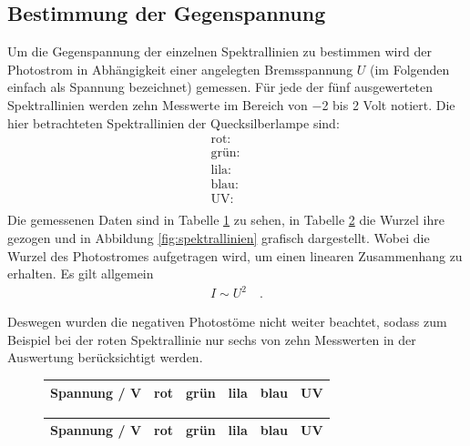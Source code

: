 \subsection{Bestimmung der Gegenspannung}
\label{sec:gegenspannung}
Um die Gegenspannung der einzelnen Spektrallinien zu bestimmen wird der Photostrom in Abhängigkeit einer angelegten Bremsspannung $U$ (im Folgenden einfach als Spannung bezeichnet) gemessen. Für jede der fünf ausgewerteten Spektrallinien werden zehn Messwerte im Bereich von  \num{-2} bis \num{2} Volt notiert.
Die hier betrachteten Spektrallinien der Quecksilberlampe sind:
\begin{align*}
	\text{rot:} \quad &  \\
	\text{grün:} \quad &  \\
	\text{lila:} \quad &  \\
	\text{blau:} \quad &  \\
	\text{UV:} \quad &  \\
\end{align*}
Die gemessenen Daten sind in Tabelle \ref{tab:messdaten1}  zu sehen, in Tabelle \ref{tab:messdaten2} die Wurzel ihre gezogen und in Abbildung \ref{fig:spektrallinien} grafisch dargestellt. Wobei die Wurzel des Photostromes aufgetragen wird, um einen linearen Zusammenhang zu erhalten. Es gilt allgemein
\begin{align}
	I \sim U^2 \quad .
\end{align}

Deswegen wurden die negativen Photostöme nicht weiter beachtet, sodass zum Beispiel bei der roten Spektrallinie nur sechs von zehn Messwerten in der Auswertung berücksichtigt werden. \\
\begin{figure}[h!]
	\centering
	\begin{tabular}{c|ccccc}
		Spannung / V & rot & grün & lila & blau & UV \\
		\hline
		
	\end{tabular}
	\label{tab:messdaten1}
\end{figure}

\begin{figure}[h!]
	\centering
	\begin{tabular}{c|ccccc}
		Spannung / V & rot & grün & lila & blau & UV \\
		\hline
		
	\end{tabular}
	\label{tab:messdaten2}
\end{figure}

